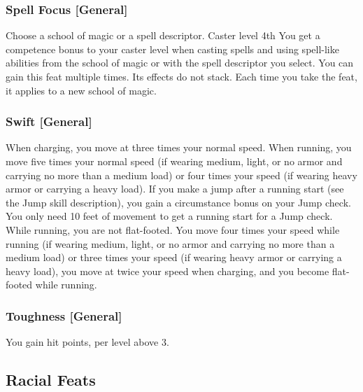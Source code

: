 \subsubsection{Spell Focus [General]}
Choose a school of magic or a spell descriptor.
 Caster level 4th
 You get a  competence bonus to your caster level when casting spells and using spell-like abilities from the school of magic or with the spell descriptor you select.
 You can gain this feat multiple times. Its effects do not stack. Each time you take the feat, it applies to a new school of magic.


\subsubsection{Swift [General]}
 When charging, you move at three times your normal speed. When running, you move five times your normal speed (if wearing medium, light, or no armor and carrying no more than a medium load) or four times your speed (if wearing heavy armor or carrying a heavy load).  If you make a jump after a running start (see the Jump skill description), you gain a  circumstance bonus on your Jump check. You only need 10 feet of movement to get a running start for a Jump check. While running, you are not flat-footed.
 You move four times your speed while running (if wearing medium, light, or no armor and carrying no more than a medium load) or three times your speed (if wearing heavy armor or carrying a heavy load), you move at twice your speed when charging, and you become flat-footed while running.

\subsubsection{Toughness [General]}
 You gain  hit points,  per level above 3.

\subsection{Racial Feats}

